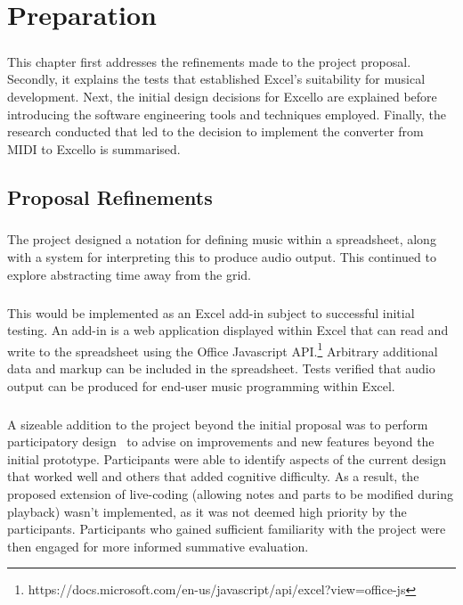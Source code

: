
\chapter{Preparation}

\paragraph{} This chapter first addresses the refinements made to the project proposal. Secondly, it explains the tests that established Excel's suitability for musical development. Next, the initial design decisions for Excello are explained before introducing the software engineering tools and techniques employed. Finally, the research conducted that led to the decision to implement the converter from MIDI to Excello is summarised.

\section{Proposal Refinements}

\paragraph{} The project designed a notation for defining music within a spreadsheet, along with a system for interpreting this to produce audio output. This continued to explore abstracting time away from the grid.

\paragraph{} This would be implemented as an Excel add-in subject to successful initial testing. An add-in is a web application displayed within Excel that can read and write to the spreadsheet using the Office Javascript API.\footnote{https://docs.microsoft.com/en-us/javascript/api/excel?view=office-js} Arbitrary additional data and markup can be included in the spreadsheet. Tests verified that audio output can be produced for end-user music programming within Excel.

\paragraph{} A sizeable addition to the project beyond the initial proposal was to perform participatory design~\cite{muller:pd} to advise on improvements and new features beyond the initial prototype. Participants were able to identify aspects of the current design that worked well and others that added cognitive difficulty. As a result, the proposed extension of live-coding (allowing notes and parts to be modified during playback) wasn't implemented, as it was not deemed high priority by the participants. Participants who gained sufficient familiarity with the project were then engaged for more informed summative evaluation.

